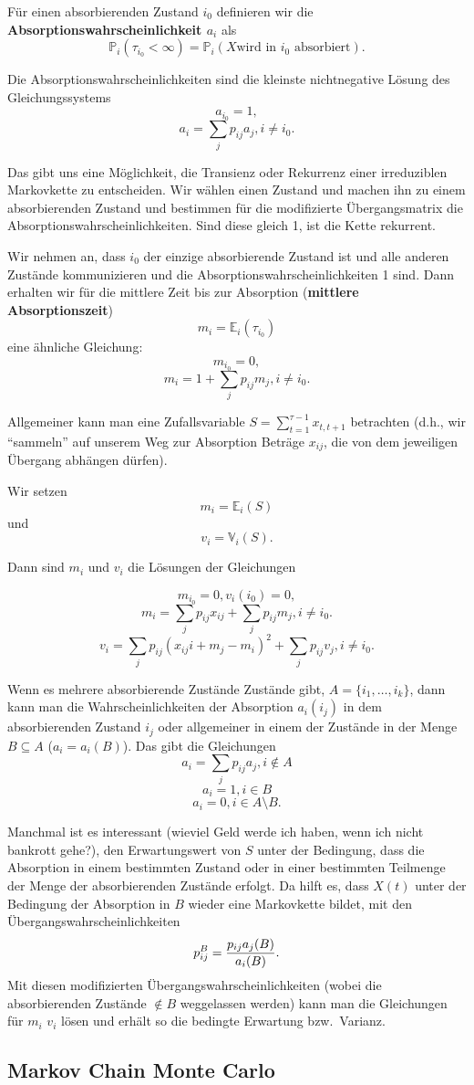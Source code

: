 Für einen absorbierenden Zustand $i_0$ definieren wir die 
\textbf{Absorptionswahrscheinlichkeit $a_i$} als
\[\mathbb P_i(\tau_{i_0}<\infty)=\mathbb P_i(X\mbox{wird in }i_0\mbox{ absorbiert}).\]



\begin{satz}
Die Absorptionswahrscheinlichkeiten sind die kleinste nichtnegative Lösung
des Gleichungssystems
\[a_{i_0}=1,\]
\[a_i=\sum_jp_{ij}a_j, i\neq i_0.\]
\end{satz}

Das gibt uns eine Möglichkeit, die Transienz oder Rekurrenz einer
irreduziblen Markovkette zu entscheiden. Wir wählen einen Zustand und
machen ihn zu einem absorbierenden Zustand und bestimmen für die
modifizierte Übergangsmatrix die Absorptionswahrscheinlichkeiten. Sind diese
gleich 1, ist die Kette rekurrent. 

Wir nehmen an, dass $i_0$ der einzige absorbierende Zustand ist und
alle anderen Zustände kommunizieren und die Absorptionswahrscheinlichkeiten
1 sind.
Dann erhalten wir für die mittlere Zeit bis zur Absorption (\textbf{mittlere Absorptionszeit})
\[m_i=\mathbb E_i(\tau_{i_0})\]
 eine ähnliche Gleichung:
\[m_{i_0}=0,
\]
\[m_i=1+\sum_jp_{ij}m_j, i\neq i_0.\]

Allgemeiner kann man eine Zufallsvariable 
$S=\sum_{t=1}^{\tau-1}x_{t,t+1}$ betrachten (d.h., wir ``sammeln'' auf
unserem Weg zur Absorption Beträge $x_{ij}$, die von dem jeweiligen
Übergang abhängen dürfen). 

Wir setzen 
\[m_i=\mathbb E_i(S)\]
und
\[v_i=\mathbb V_i(S).\]

Dann sind $m_i$ und $v_i$ die Lösungen der Gleichungen

\[m_{i_0}=0,v_i(i_0)=0,\]
\[m_i=\sum_jp_{ij}x_{ij}+\sum_jp_{ij}m_j, i\neq i_0.\]
\[v_i=\sum_jp_{ij}(x_{ij}i+m_j-m_i)^2+\sum_jp_{ij}v_j, i\neq i_0.\]

Wenn es mehrere absorbierende Zustände Zustände gibt, $A=\{i_1,\dots,i_k\}$,
dann kann man die Wahrscheinlichkeiten der Absorption  $a_i(i_j)$ in dem
absorbierenden Zustand $i_j$ oder allgemeiner in einem der Zustände in der
Menge $B\subseteq A$ ($a_i=a_i(B)$). Das gibt die Gleichungen
\[a_i=\sum_jp_{ij}a_j, i\not\in A\]
\[a_i=1, i\in B\]
\[a_i=0, i\in A\setminus B.\]

Manchmal ist es interessant (wieviel Geld werde ich haben, wenn ich nicht
bankrott gehe?), den Erwartungswert von $S$ unter der Bedingung, dass die
Absorption in einem bestimmten Zustand oder in einer bestimmten Teilmenge
der Menge der absorbierenden Zustände erfolgt. 
Da hilft es, dass $X(t)$ unter der Bedingung der Absorption in $B$
wieder eine Markovkette bildet, mit den Übergangswahrscheinlichkeiten
\[p_{ij}^B={p_{ij}a_j(B)\over a_i(B)}.\]
Mit diesen modifizierten Übergangswahrscheinlichkeiten (wobei die
absorbierenden Zustände $\not\in B$ weggelassen werden) kann man
die Gleichungen für $m_i$ $v_i$ lösen und erhält so die bedingte
Erwartung bzw.\ Varianz.




\subsection{Markov Chain Monte Carlo}



